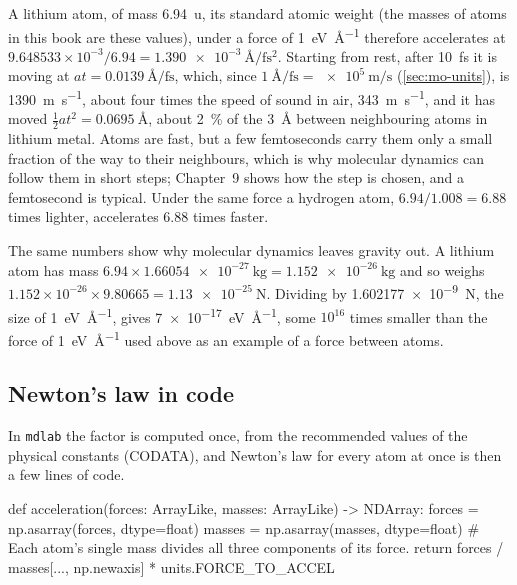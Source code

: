 A lithium atom, of mass \SI{6.94}{\amu}, its standard atomic
weight\cite{Prohaska2022} (the masses of atoms in this book are these
values), under a force of
\SI{1}{\electronvolt\per\angstrom} therefore accelerates at
$9.648533\times10^{-3}/6.94 = \SI{1.390e-3}{\angstrom\per\femto\second
\squared}$. Starting from rest, after \SI{10}{\femto\second} it is moving
at $at = \SI{0.0139}{\angstrom\per\femto\second}$, which, since
$\SI{1}{\angstrom\per\femto\second} = \SI{e5}{\metre\per\second}$
(\cref{sec:mo-units}), is \SI{1390}{\metre\per\second}, about four times
the speed of sound in air, \SI{343}{\metre\per\second},
and it has moved $\tfrac12 at^2 = \SI{0.0695}{\angstrom}$, about
\SI{2}{\percent} of the \SI{3}{\angstrom} between neighbouring atoms in
lithium metal. Atoms are fast, but a few femtoseconds carry them only a
small fraction of the way to their neighbours, which is why molecular
dynamics can follow them in short steps; Chapter~9 shows how the step is
chosen, and a femtosecond is typical. Under the same force a hydrogen
atom, $6.94/1.008 = 6.88$ times lighter, accelerates $6.88$ times faster.

The same numbers show why molecular dynamics leaves gravity out. A
lithium atom has mass $6.94\times\SI{1.66054e-27}{\kilogram} =
\SI{1.152e-26}{\kilogram}$ and so weighs $1.152\times10^{-26}\times
9.80665 = \SI{1.13e-25}{\newton}$. Dividing by
\SI{1.602177e-9}{\newton}, the size of \SI{1}{\electronvolt\per\angstrom},
gives \SI{7e-17}{\electronvolt\per\angstrom}, some $10^{16}$ times
smaller than the force of \SI{1}{\electronvolt\per\angstrom} used above
as an example of a force between atoms.

\subsection*{Newton's law in code}

In \texttt{mdlab} the factor is computed once, from the recommended
values of the physical constants (CODATA), and Newton's law for every
atom at once is then a few lines of code.

\begin{code}
def acceleration(forces: ArrayLike, masses: ArrayLike) -> NDArray:
    forces = np.asarray(forces, dtype=float)
    masses = np.asarray(masses, dtype=float)
    # Each atom's single mass divides all three components of its force.
    return forces / masses[..., np.newaxis] * units.FORCE_TO_ACCEL
\end{code}

